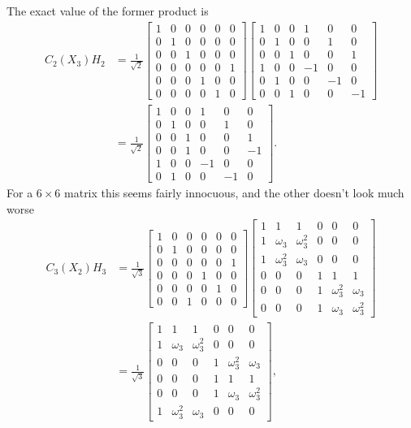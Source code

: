 The exact value of the former product is
\begin{align*}
	C_2(X_3)H_2 &=
	\frac{1}{\sqrt{2}}
	\begin{bmatrix}
		1&0&0&0&0&0\\
		0&1&0&0&0&0\\ 
		0&0&1&0&0&0\\ 
		0&0&0&0&0&1\\ 
		0&0&0&1&0&0\\ 
		0&0&0&0&1&0
	\end{bmatrix}
	\begin{bmatrix}
		1&0&0&1&0&0\\ 
		0&1&0&0&1&0\\ 
		0&0&1&0&0&1\\ 
		1&0&0&-1&0&0\\ 
		0&1&0&0&-1&0\\ 
		0&0&1&0&0&-1
	\end{bmatrix}
	\\&=
	\frac{1}{\sqrt{2}}
	\begin{bmatrix}
		1&0&0&1&0&0\\ 
		0&1&0&0&1&0\\ 
		0&0&1&0&0&1\\ 
		0&0&1&0&0&-1\\ 
		1&0&0&-1&0&0\\ 
		0&1&0&0&-1&0
	\end{bmatrix}.
\end{align*}
For a $6\times6$ matrix this seems fairly innocuous, and the other doesn't look much worse
\begin{align*}
	C_3(X_2)H_3 &=
	\frac{1}{\sqrt{3}}
	\begin{bmatrix}
		1&0&0&0&0&0\\
		0&1&0&0&0&0\\ 
		0&0&0&0&0&1\\ 
		0&0&0&1&0&0\\ 
		0&0&0&0&1&0\\ 
		0&0&1&0&0&0
	\end{bmatrix}
	\begin{bmatrix}
		1&1&1&0&0&0\\ 
		1&\omega_3&\omega_3^2&0&0&0\\ 
		1&\omega_3^2&\omega_3&0&0&0\\ 
		0&0&0&1&1&1\\ 
		0&0&0&1&\omega_3^2&\omega_3\\ 
		0&0&0&1&\omega_3&\omega_3^2
	\end{bmatrix}
	\\&=
	\frac{1}{\sqrt{3}}
	\begin{bmatrix}
		1&1&1&0&0&0\\ 
		1&\omega_3&\omega_3^2&0&0&0\\
		0&0&0&1&\omega_3^2&\omega_3\\ 
		0&0&0&1&1&1\\ 
		0&0&0&1&\omega_3&\omega_3^2\\
		1&\omega_3^2&\omega_3&0&0&0
	\end{bmatrix},
\end{align*}

